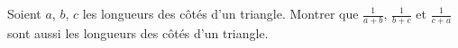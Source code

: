 Soient $a$, $b$, $c$ les longueurs des côtés d'un triangle. Montrer que $\frac{1}{a+b}$, $\frac{1}{b+c}$ et $\frac{1}{c+a}$ sont aussi les longueurs des côtés d'un triangle.
